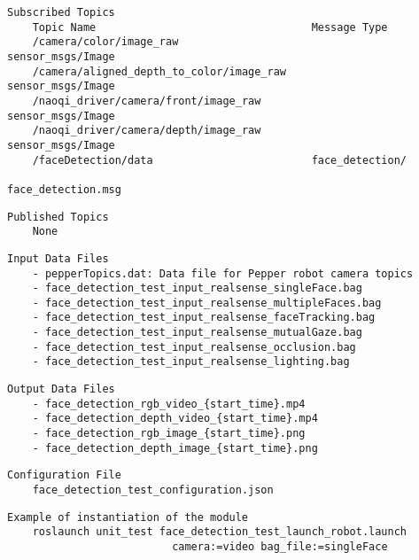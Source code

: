 \documentclass{CSSRforAfrica}
\newcommand{\checkboxChecked}{\fbox{\ding{51}}} %
\begin{document}
\begin{description}
\item[\checkboxChecked] 
 {\small 
\begin{verbatim}
Subscribed Topics
    Topic Name                                  Message Type
    /camera/color/image_raw                     sensor_msgs/Image              
    /camera/aligned_depth_to_color/image_raw    sensor_msgs/Image
    /naoqi_driver/camera/front/image_raw        sensor_msgs/Image
    /naoqi_driver/camera/depth/image_raw        sensor_msgs/Image
    /faceDetection/data                         face_detection/
                                                 face_detection.msg
\end{verbatim}}

\item[\checkboxChecked] 
 {\small 
\begin{verbatim}
Published Topics
    None
\end{verbatim}}

\item[\checkboxChecked] 
 {\small 
\begin{verbatim}
Input Data Files
    - pepperTopics.dat: Data file for Pepper robot camera topics
    - face_detection_test_input_realsense_singleFace.bag
    - face_detection_test_input_realsense_multipleFaces.bag
    - face_detection_test_input_realsense_faceTracking.bag
    - face_detection_test_input_realsense_mutualGaze.bag
    - face_detection_test_input_realsense_occlusion.bag
    - face_detection_test_input_realsense_lighting.bag

\end{verbatim}}

\item[\checkboxChecked] 
 {\small 
\begin{verbatim}
Output Data Files
    - face_detection_rgb_video_{start_time}.mp4
    - face_detection_depth_video_{start_time}.mp4
    - face_detection_rgb_image_{start_time}.png
    - face_detection_depth_image_{start_time}.png
\end{verbatim}}

\item[\checkboxChecked] 
 {\small 
\begin{verbatim}
Configuration File
    face_detection_test_configuration.json
\end{verbatim}}

\item[\checkboxChecked] 
 {\small 
\begin{verbatim}
Example of instantiation of the module
    roslaunch unit_test face_detection_test_launch_robot.launch 
                          camera:=video bag_file:=singleFace
    

\end{verbatim}}
\end{description}
\end{document}
